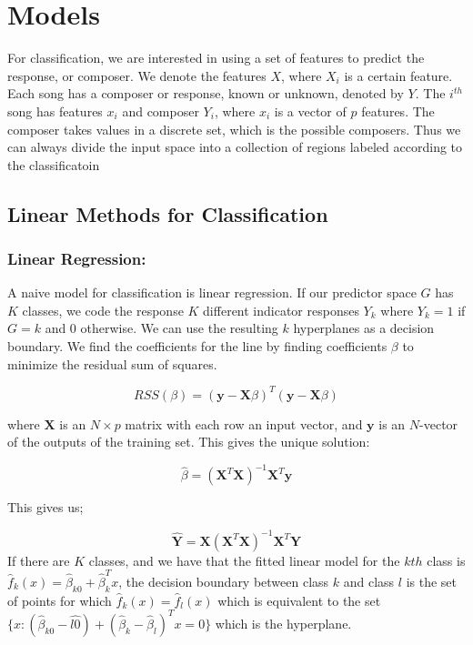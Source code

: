 \documentclass[12pt,twoside]{reedthesis}
\theoremstyle{definition}
\theoremstyle{definition}
\theoremstyle{definition}
\theoremstyle{remark}
\begin{document}
\chapter{Models}\label{models}

For classification, we are interested in using a set of features to
predict the response, or composer. We denote the features \(X\), where
\(X_i\) is a certain feature. Each song has a composer or response,
known or unknown, denoted by \(Y\). The \(i^{th}\) song has features
\(x_i\) and composer \(Y_i\), where \(x_i\) is a vector of \(p\)
features. The composer takes values in a discrete set, which is the
possible composers. Thus we can always divide the input space into a
collection of regions labeled according to the classificatoin

\section{Linear Methods for
Classification}\label{linear-methods-for-classification}

\subsection{Linear Regression:}\label{linear-regression}

A naive model for classification is linear regression. If our predictor
space \(G\) has \(K\) classes, we code the response \(K\) different
indicator responses \(Y_k\) where \(Y_k = 1\) if \(G = k\) and 0
otherwise. We can use the resulting \(k\) hyperplanes as a decision
boundary. We find the coefficients for the line by finding coefficients
\(\beta\) to minimize the residual sum of squares.

\[ RSS(\beta) = (\textbf{y} - \textbf{X}\beta)^T(\textbf{y} - \textbf{X}\beta) \]

where \(\textbf{X}\) is an \(N\times p\) matrix with each row an input
vector, and \(\textbf{y}\) is an \(N\)-vector of the outputs of the
training set. This gives the unique solution:

\[ \hat{\beta} = (\textbf{X}^T\textbf{X})^{-1}\textbf{X}^T\textbf{y}\]

This gives us;

\[\hat{\textbf{Y}} = \textbf{X}(\textbf{X}^T\textbf{X})^{-1}\textbf{X}^T
\textbf{Y}\] If there are \(K\) classes, and we have that the fitted
linear model for the \(kth\) class is
\(\hat{f}_k(x) = \hat{\beta}_{k0} + \hat{\beta}^T_kx\), the decision
boundary between class \(k\) and class \(l\) is the set of points for
which \(\hat{f}_k(x) = \hat{f}_l(x)\) which is equivalent to the set
\(\{x: (\hat{\beta}_{k0} - \hat{l0}) + (\hat{\beta}_k - \hat{\beta}_l)^Tx = 0\}\)
which is the hyperplane.
\end{document}
